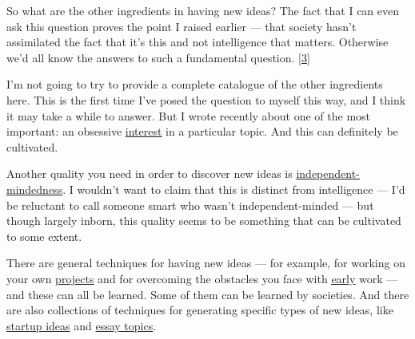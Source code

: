 So what are the other
                  ingredients in having new ideas? The fact that I can even ask
                  this question proves the point I raised earlier --- that
                  society hasn't assimilated the fact that it's this and not
                  intelligence that matters. Otherwise we'd all know the answers
                  to such a fundamental question.
                  [\href{\#f3n}{3}]

I'm not going to try to provide a complete
                  catalogue of the other ingredients here. This is the first
                  time I've posed the question to myself this way, and I think
                  it may take a while to answer. But I wrote recently about one
                  of the most important: an obsessive
                  \href{http://www.paulgraham.com/genius.html}{\underline{interest}} in a particular
                  topic. And this can definitely be cultivated.

Another
                  quality you need in order to discover new ideas is
                  \href{http://www.paulgraham.com/think.html}{\underline{independent-mindedness}}. I wouldn't want to claim that this is distinct from
                  intelligence --- I'd be reluctant to call someone smart
                  who wasn't independent-minded --- but though largely
                  inborn, this quality seems to be something that can be
                  cultivated to some extent.

There are general
                  techniques for having new ideas --- for example, for
                  working on your own \href{http://www.paulgraham.com/own.html}{\underline{projects}} and
                  for overcoming the obstacles you face with
                  \href{http://www.paulgraham.com/early.html}{\underline{early}} work --- and these
                  can all be learned. Some of them can be learned by societies.
                  And there are also collections of techniques for generating
                  specific types of new ideas, like
                  \href{http://www.paulgraham.com/startupideas.html}{startup ideas} and
                  \href{http://www.paulgraham.com/essay.html}{essay topics}.

